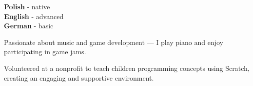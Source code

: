 \documentclass[9pt]{config}
\begin{document}
\begin{minipage}[t]{0.3\textwidth}
  \vspace{-\baselineskip}


  \textbf{Polish} - native\\
  \textbf{English} - advanced\\
  \textbf{German} - basic\\
\end{minipage}
\hfill
\begin{minipage}[t]{0.3\textwidth}
  \vspace{-\baselineskip}


  Passionate about music and game development — I play piano and
  enjoy participating in game jams.
\end{minipage}
\hfill
\begin{minipage}[t]{0.3\textwidth}
  \vspace{-\baselineskip}


  Volunteered at a nonprofit to teach children programming concepts
  using Scratch, creating an engaging and supportive environment.
\end{minipage}

\end{document}
